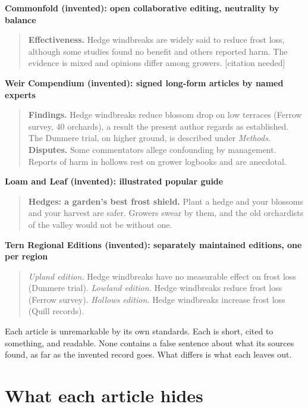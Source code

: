 \documentclass[11pt]{article}
\newenvironment{excerpt}[1]
  {\par\smallskip\noindent\textbf{#1}\par\begin{quote}\small}
  {\end{quote}}
\begin{document}
\begin{excerpt}{Commonfold (invented): open collaborative editing, neutrality by balance}
\textbf{Effectiveness.} Hedge windbreaks are widely said to reduce frost loss, although some studies found no benefit and others reported harm. The evidence is mixed and opinions differ among growers. [citation needed]
\end{excerpt}

\begin{excerpt}{Weir Compendium (invented): signed long-form articles by named experts}
\textbf{Findings.} Hedge windbreaks reduce blossom drop on low terraces (Ferrow survey, 40 orchards), a result the present author regards as established. The Dunmere trial, on higher ground, is described under \emph{Methods}. \textbf{Disputes.} Some commentators allege confounding by management. Reports of harm in hollows rest on grower logbooks and are anecdotal.
\end{excerpt}

\begin{excerpt}{Loam and Leaf (invented): illustrated popular guide}
\textbf{Hedges: a garden's best frost shield.} Plant a hedge and your blossoms and your harvest are safer. Growers swear by them, and the old orchardists of the valley would not be without one.
\end{excerpt}

\begin{excerpt}{Tern Regional Editions (invented): separately maintained editions, one per region}
\emph{Upland edition.} Hedge windbreaks have no measurable effect on frost loss (Dunmere trial).
\emph{Lowland edition.} Hedge windbreaks reduce frost loss (Ferrow survey).
\emph{Hollows edition.} Hedge windbreaks increase frost loss (Quill records).
\end{excerpt}

Each article is unremarkable by its own standards. Each is short, cited to something, and readable. None contains a false sentence about what its sources found, as far as the invented record goes. What differs is what each leaves out.

\section{What each article hides}\label{sec:hides}
\end{document}
